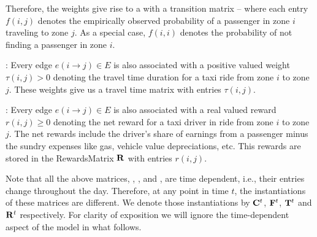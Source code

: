 Therefore, the weights give rise to a {\markovchain} with a transition matrix {\empiricaltransitionmatrix} -- 
where each entry $f(i,j)$ 
denotes the empirically observed probability of a passenger in zone $i$
traveling to zone $j$. 
As a special case, 
$f(i,i)$ denotes the probability of not finding a passenger in zone $i$. 


:
Every edge $e(i\rightarrow j) \in E$ is also associated with a positive valued weight $\tau(i,j) > 0$ 
denoting the travel time duration for a taxi ride from zone $i$ to zone $j$. 
These weights give us a travel time matrix {\traveltimematrix} with entries $\tau(i,j)$. 


:
Every edge $e(i \rightarrow j) \in E$ is also associated with a real valued reward $r(i,j) \geq 0$ denoting
the net reward for a taxi driver in ride from zone $i$ to zone $j$. The net rewards include the driver's
share of earnings from a passenger minus the sundry expenses like gas, vehicle value depreciations, etc. This rewards are stored in the {\sc RewardsMatrix} ${\mathbf{R}}$
with entries $r(i,j)$.

Note that all the above matrices, {\countmatrix}, {\empiricaltransitionmatrix}, {\traveltimematrix} and {\rewardsmatrix}, are time dependent, i.e., their entries change throughout the day. Therefore, at any point in time $t$, the instantiations of these matrices
are different. We denote those instantiations by ${\mathbf{C}}^t$, ${\mathbf{F}}^t$, ${\mathbf{T}}^t$ and ${\mathbf{R}}^t$ respectively.
For clarity of exposition we will ignore the time-dependent aspect of the model in what follows.


